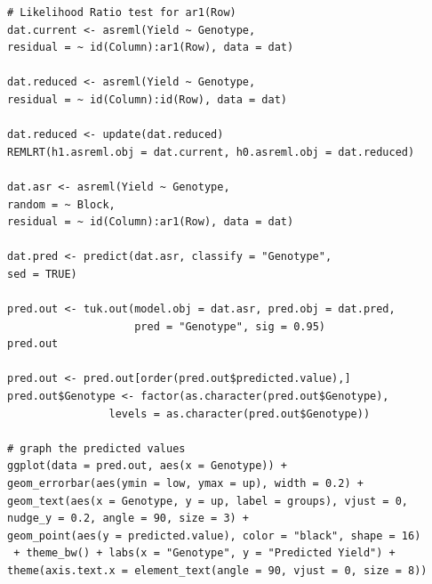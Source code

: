 \documentclass[a4paper, 10pt, fleqn, twosided]{memoir}
\begin{document}
\begin{tcolorbox}[title = Exercise 16 code]
\begin{verbatim}
# Likelihood Ratio test for ar1(Row)
dat.current <- asreml(Yield ~ Genotype,
residual = ~ id(Column):ar1(Row), data = dat)

dat.reduced <- asreml(Yield ~ Genotype,
residual = ~ id(Column):id(Row), data = dat)

dat.reduced <- update(dat.reduced)
REMLRT(h1.asreml.obj = dat.current, h0.asreml.obj = dat.reduced)

dat.asr <- asreml(Yield ~ Genotype,
random = ~ Block,
residual = ~ id(Column):ar1(Row), data = dat)

dat.pred <- predict(dat.asr, classify = "Genotype",
sed = TRUE)

pred.out <- tuk.out(model.obj = dat.asr, pred.obj = dat.pred,
                    pred = "Genotype", sig = 0.95)
pred.out

pred.out <- pred.out[order(pred.out$predicted.value),]
pred.out$Genotype <- factor(as.character(pred.out$Genotype),
                levels = as.character(pred.out$Genotype))
 
# graph the predicted values 
ggplot(data = pred.out, aes(x = Genotype)) +
geom_errorbar(aes(ymin = low, ymax = up), width = 0.2) +
geom_text(aes(x = Genotype, y = up, label = groups), vjust = 0,
nudge_y = 0.2, angle = 90, size = 3) +
geom_point(aes(y = predicted.value), color = "black", shape = 16)
 + theme_bw() + labs(x = "Genotype", y = "Predicted Yield") +
theme(axis.text.x = element_text(angle = 90, vjust = 0, size = 8))
\end{verbatim}
\end{tcolorbox}
\end{document}
